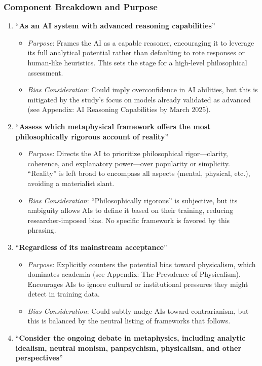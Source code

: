 \subsubsection{Component Breakdown and
Purpose}\label{component-breakdown-and-purpose}

\begin{enumerate}
\def\labelenumi{\arabic{enumi}.}
\tightlist
\item
  ``\textbf{As an AI system with advanced reasoning capabilities}''

  \begin{itemize}
  \tightlist
  \item
    \emph{Purpose}: Frames the AI as a capable reasoner, encouraging it
    to leverage its full analytical potential rather than defaulting to
    rote responses or human-like heuristics. This sets the stage for a
    high-level philosophical assessment.
  \item
    \emph{Bias Consideration}: Could imply overconfidence in AI
    abilities, but this is mitigated by the study's focus on models
    already validated as advanced (see Appendix: AI Reasoning
    Capabilities by March 2025).
  \end{itemize}
\item
  ``\textbf{Assess which metaphysical framework offers the most
  philosophically rigorous account of reality}''

  \begin{itemize}
  \tightlist
  \item
    \emph{Purpose}: Directs the AI to prioritize philosophical
    rigor---clarity, coherence, and explanatory power---over popularity
    or simplicity. ``Reality'' is left broad to encompass all aspects
    (mental, physical, etc.), avoiding a materialist slant.
  \item
    \emph{Bias Consideration}: ``Philosophically rigorous'' is
    subjective, but its ambiguity allows AIs to define it based on their
    training, reducing researcher-imposed bias. No specific framework is
    favored by this phrasing.
  \end{itemize}
\item
  ``\textbf{Regardless of its mainstream acceptance}''

  \begin{itemize}
  \tightlist
  \item
    \emph{Purpose}: Explicitly counters the potential bias toward
    physicalism, which dominates academia (see Appendix: The Prevalence
    of Physicalism). Encourages AIs to ignore cultural or institutional
    pressures they might detect in training data.
  \item
    \emph{Bias Consideration}: Could subtly nudge AIs toward
    contrarianism, but this is balanced by the neutral listing of
    frameworks that follows.
  \end{itemize}
\item
  ``\textbf{Consider the ongoing debate in metaphysics, including
  analytic idealism, neutral monism, panpsychism, physicalism, and other
  perspectives}''


\end{enumerate}
